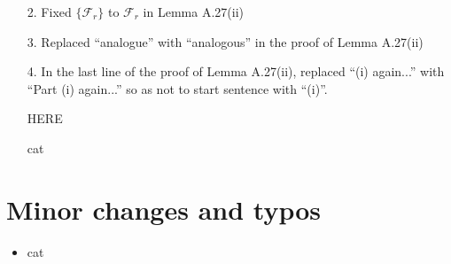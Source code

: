 \documentclass{article}
\begin{document}
\begin{itemize}

\item[2.] Fixed $\{\mathcal{F}_r\}$
to $\mathcal{F}_r$ in Lemma A.27(ii)
     
\item[3.] Replaced ``analogue'' with ``analogous'' in the proof of Lemma A.27(ii)

\item[4.]
In the last line of the proof of Lemma A.27(ii),
replaced ``(i) again...'' with ``Part (i) again...''
so as not to start sentence with ``(i)''.

{\color{red} HERE}

cat



                           
\end{itemize}








\section{Minor changes and typos}
 

\begin{itemize}
	\item cat
\end{itemize}







{}


\end{document}
